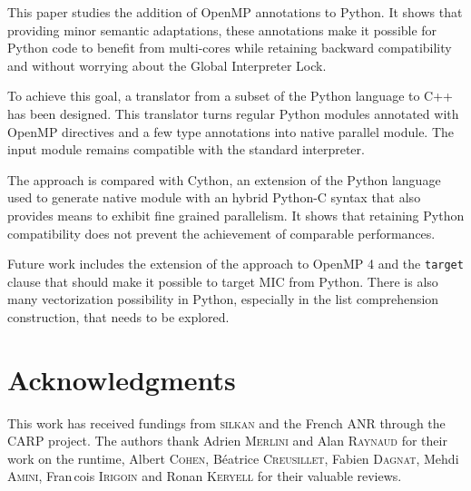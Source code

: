 \documentclass{llncs}
\begin{document}
This paper studies the addition of OpenMP annotations to Python. It shows that
providing minor semantic adaptations, these annotations make it possible for
Python code to benefit from multi-cores while retaining backward compatibility
and without worrying about the Global Interpreter Lock.

To achieve this goal, a translator from a subset of the Python language to C++
has been designed. This translator turns regular Python modules annotated with
OpenMP directives and a few type annotations into native parallel module. The
input module remains compatible with the standard interpreter.

The approach is compared with Cython, an extension of the Python language used
to generate native module with an hybrid Python-C syntax that also provides
means to exhibit fine grained parallelism. It shows that retaining Python
compatibility does not prevent the achievement of comparable performances.

Future work includes the extension of the approach to OpenMP 4 and the
\texttt{target} clause that should make it possible to target MIC from Python.
There is also many vectorization possibility in Python, especially in the list
comprehension construction, that needs to be explored.

\section*{Acknowledgments}

This work has received fundings from \textsc{silkan} and the French ANR through the
CARP project. The authors thank Adrien \textsc{Merlini} and Alan
\textsc{Raynaud} for their work on the runtime, Albert \textsc{Cohen},
B{\'e}atrice \textsc{Creusillet}, Fabien \textsc{Dagnat}, Mehdi \textsc{Amini},
Fran{\,c}ois \textsc{Irigoin} and Ronan \textsc{Keryell} for their valuable
reviews.



\end{document}
